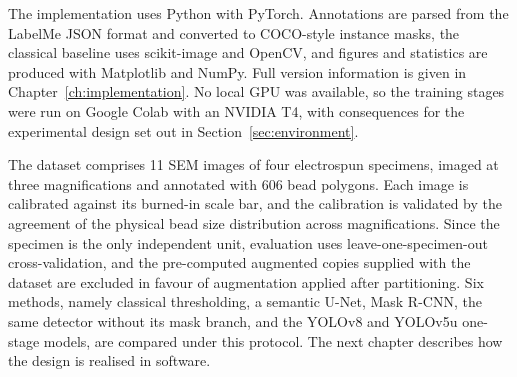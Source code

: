 The implementation uses Python with PyTorch. Annotations are parsed from the
LabelMe JSON format and converted to COCO-style instance masks, the classical
baseline uses scikit-image and OpenCV, and figures and statistics are produced
with Matplotlib and NumPy. Full version information is given in
Chapter~\ref{ch:implementation}. No local GPU was available, so the training
stages were run on Google Colab with an NVIDIA T4, with consequences for the
experimental design set out in Section~\ref{sec:environment}.

The dataset comprises 11 SEM images of four electrospun specimens, imaged at
three magnifications and annotated with 606 bead polygons. Each image is
calibrated against its burned-in scale bar, and the calibration is validated by
the agreement of the physical bead size distribution across magnifications. Since
the specimen is the only independent unit, evaluation uses leave-one-specimen-out
cross-validation, and the pre-computed augmented copies supplied with the dataset
are excluded in favour of augmentation applied after partitioning. Six methods,
namely classical thresholding, a semantic U-Net, Mask R-CNN, the same detector
without its mask branch, and the YOLOv8 and YOLOv5u one-stage models, are compared
under this protocol. The next chapter describes how the design is realised in
software.
